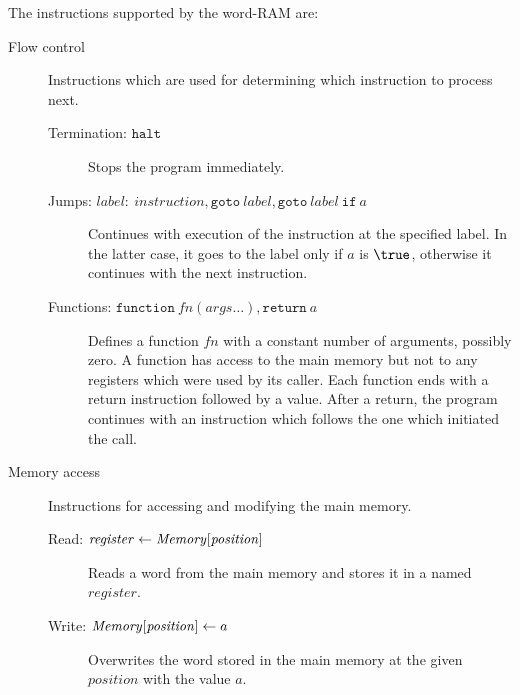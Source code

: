 The instructions supported by the word-RAM are:
\begin{description}
	\item[Flow control]
	Instructions which are used for determining which instruction to process next.
	\begin{description}
		\item[Termination: \textnormal{$\texttt{halt}$}]
		Stops the program immediately.
		\item[Jumps: \textnormal{$\mathit{label}{:}\ \mathit{instruction}, \texttt{goto}\ \mathit{label}, \texttt{goto}\ \mathit{label}\ \texttt{if}\ a$}]
		Continues with execution of the instruction at the specified label.
		In the latter case, it goes to the label only if $a$ is $\true$, otherwise it continues with the next instruction.
		\item[Functions: \textnormal{$\texttt{function}\ \mathit{fn}(\mathit{args}\ldots), \texttt{return}\ a$}]
		Defines a function $\mathit{fn}$ with a constant number of arguments, possibly zero.
		A function has access to the main memory but not to any registers which were used by its caller.
		Each function ends with a return instruction followed by a value.
		After a return, the program continues with an instruction which follows the one which initiated the call.
	\end{description}
	
	\item[Memory access]
	Instructions for accessing and modifying the main memory.
	\begin{description}
		\item[Read: $\mathit{register} \gets \mathit{Memory}[\mathit{position}\char93$]
		Reads a word from the main memory and stores it in a named $\mathit{register}$.
		\item[Write: $\mathit{Memory}[\mathit{position}\char93 \gets a$]
		Overwrites the word stored in the main memory at the given $position$ with the value $a$.
	\end{description}
	

\end{description}
